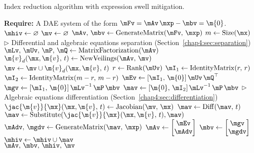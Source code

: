 \begin{breakablealgorithm}
  \caption{Index reduction algorithm with expression swell mitigation.}
  \label{chap4:alg:index_reduction_veil}
  \begin{algorithmic}[1]
    \State \textbf{Require:} A \ac{DAE} system of the form $\mFv = \mAv \, \mxp - \mbv = \m{0}$.
     
      \State $\mhiv \gets \varnothing$ 
      \State $\mv \gets \varnothing$ 
      \State $\mAv, \, \mbv \gets \mathrm{GenerateMatrix}(\mFv, \, \mxp)$ 
      \State $m \gets \mathrm{Size}(\mx)$
        \State $\displaystyle\triangleright$ Differential and algebraic equations separation (Section~\ref{chap4:sec:separation})
        \State $\mLv, \, \mUv, \, \mP, \, \mQ \gets \mathrm{MatrixFactorization}(\mAv)$ 
        \State $\m{v}_d(\mx, \m{v}, \, t) \gets \mathrm{NewVeilings}(\mAv, \, \mv)$ 
        \State $\mv \gets \mv \cup \m{v}_d(\mx, \m{v}, \, t)$ 
        \State $r \gets \mathrm{Rank}(\mUv)$ 
        \State $\mI_1 \gets \mathrm{IdentityMatrix}(r, \, r)$ 
        \State $\mI_2 \gets \mathrm{IdentityMatrix}(m-r, \, m-r)$ 
        \State $\mEv \gets [\mI_1, \, \m{0}] \, \mUv \, \mQ^\top$ 
        \State $\mgv \gets [\mI_1, \, \m{0}] \, \mLv^{-1} \, \mP \, \mbv$ 
        \State $\mav \gets [\m{0}, \, \mI_2] \, \mLv^{-1} \, \mP \, \mbv$ 
        \State $\displaystyle\triangleright$ Algebraic equations differentiation (Section~\ref{chap4:sec:differentiation})
        \State $\jac{\m{v}}{\mx}(\mx, \m{v}, \, t) \gets \mathrm{Jacobian}(\mv, \, \mx)$ 
        \State $\mav \gets \mathrm{Diff}(\mav, \, t)$ 
        \State $\mav \gets \mathrm{Substitute}(\jac{\m{v}}{\mx}(\mx, \m{v}, \, t), \mav)$ 
        \State $\mAdv, \, \mgdv \gets \mathrm{GenerateMatrix}(\mav, \, \mxp)$ 
        \State $\mAv \gets \begin{bmatrix} \mEv \\ \mAdv \end{bmatrix}$ 
        \State $\mbv \gets \begin{bmatrix} \mgv \\ \mgdv \end{bmatrix}$ 
        \State $\mhiv \gets \mhiv \cup \mav$ 
      \EndWhile \\
      \Return $\mAv, \, \mbv, \, \mhiv, \, \mv$ 
    \EndProcedure
  \end{algorithmic}
\end{breakablealgorithm}

